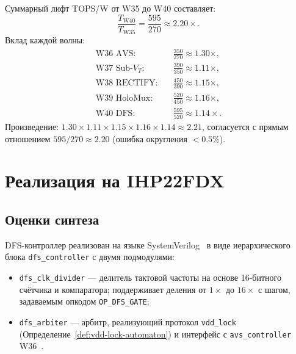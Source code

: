 
\begin{proposition}
\label{prop:tops-w-decomposition}
Суммарный лифт TOPS/W от W35 до W40 составляет:
\[
  \frac{T_{\mathrm{W40}}}{T_{\mathrm{W35}}} = \frac{595}{270} \approx 2{.}20\times.
\]
Вклад каждой волны:
\begin{align*}
  \text{W36 AVS:}    & \quad \frac{350}{270} \approx 1{.}30\times, \\
  \text{W37 Sub-}V_T:& \quad \frac{390}{350} \approx 1{.}11\times, \\
  \text{W38 RECTIFY:}& \quad \frac{450}{390} \approx 1{.}15\times, \\
  \text{W39 HoloMux:}& \quad \frac{520}{450} \approx 1{.}16\times, \\
  \text{W40 DFS:}    & \quad \frac{595}{520} \approx 1{.}14\times.
\end{align*}
Произведение: $1{.}30 \times 1{.}11 \times 1{.}15 \times 1{.}16 \times 1{.}14 \approx 2{.}21$,
согласуется с прямым отношением $595/270 \approx 2{.}20$ (ошибка округления $<0{.}5\%$).
\end{proposition}

\section{Реализация на IHP22FDX}
\label{sec:glava86-ihp22fdx}


\subsection{Оценки синтеза}
\label{subsec:synth-estimates}

DFS-контроллер реализован на языке SystemVerilog~\cite{IEEE-SV-1800-2017}
в виде иерархического блока \texttt{dfs\_controller} с двумя
подмодулями:
\begin{itemize}
  \item \texttt{dfs\_clk\_divider} — делитель тактовой частоты на основе
        16-битного счётчика и компаратора; поддерживает деления от $1\times$
        до $16\times$ с шагом, задаваемым опкодом \texttt{OP\_DFS\_GATE};
  \item \texttt{dfs\_arbiter} — арбитр, реализующий протокол \texttt{vdd\_lock}
        (Определение~\ref{def:vdd-lock-automaton}) и интерфейс с
        \texttt{avs\_controller} W36~\cite{trinity-fpga134}.
\end{itemize}

